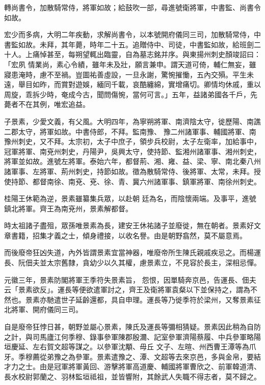\begin{pinyinscope}
 轉尚書令，加散騎常侍，將軍如故；給鼓吹一部，尋進號衛將軍，中書監、尚書令如故。



 宏少而多病，大明二年疾動，求解尚書令，以本號開府儀同三司，加散騎常侍，中書監如故。未拜，其年薨，時年二十五。追贈侍中、司徒，中書監如故，給班劍二十人。上痛悼甚至，每朔望輒出臨靈，自為墓志銘并序。與東揚州刺史顏竣詔曰：「宏夙
 情業尚，素心令績，雖年未及壯，願言兼申。謂天道可倚，輔仁無妄，雖寢患淹時，慮不至禍。豈圖祐善虛設，一旦永謝，驚惋摧慟，五內交殞。平生未遠，舉目如昨，而賞對遊娛，緬同千載，哀酷纏綿，實增痛切。卿情均休戚，重以周旋，乖拆少時，奄成今古，聞問傷惋，當何可言。」五年，益諸弟國各千戶，先薨者不在其例，唯宏追益。



 子景素，少愛文義，有父風。大明四年，為寧朔將軍、南濟陰太守，徙歷陽、南譙二郡太守，將軍如故。中書侍郎，不拜。監南豫、
 豫二州諸軍事、輔國將軍、南豫州刺史，又不拜。太宗初，太子中庶子，領步兵校尉，太子左衛率，加給事中，冠軍將軍、南兗州刺史，丹陽尹，吳興太守，使持節、監湘州諸軍事、湘州刺史，將軍並如故。進號左將軍。泰始六年，都督荊、湘、雍、益、梁、寧、南北秦八州諸軍事、左將軍、荊州刺史，持節如故。徵為散騎常侍、後將軍、太常，未拜。授使持節、都督南徐、南兗、兗、徐、青、冀六州諸軍事、鎮軍將軍、南徐州刺史。



 桂陽王休範為逆，景素雖纂集兵眾，以赴朝
 廷為名，而陰懷兩端。及事平，進號鎮北將軍。齊王為南兗州，景素解都督。



 時太祖諸子盡殂，眾孫唯景素為長，建安王休祐諸子並廢徙，無在朝者。景素好文章書籍，招集才義之士，傾身禮接，以收名譽。由是朝野翕然，莫不屬意焉。



 而後廢帝狂凶失道，內外皆謂景素宜當神器，唯廢帝所生陳氏親戚疾忌之。而楊運長、阮佃夫並太宗舊隸，貪幼少以久其權，慮景素立，不見容於長主，深相忌憚。



 元徽三年，景素防閣將軍王季符失景素旨，
 怨恨，因單騎奔京邑，告運長、佃夫云「景素欲反」。運長等便欲遣軍討之，齊王及衛將軍袁粲以下並保持之，謂為不然也。景素亦馳遣世子延齡還都，具自申理。運長等乃徙季符於梁州，又奪景素征北將軍、開府儀同三司。



 自是廢帝狂悖日甚，朝野並屬心景素，陳氏及運長等彌相猜疑。景素因此稍為自防之計，與司馬廬江何季穆、錄事參軍陳郡殷濔、記室參軍濟陽蔡履、中兵參軍略陽垣慶延、左右賀文超等謀之。以參軍沈顒、毋丘
 文子、左暄、州西曹王潭等為爪牙。季穆薦從弟豫之為參軍。景素遣豫之、潭、文超等去來京邑，多與金帛，要結才力之士。由是冠軍將軍黃回、游擊將軍高道慶、輔國將軍曹欣之、前軍韓道清、長水校尉郭蘭之、羽林監垣祗祖，並皆響附，其餘武人失職不得志者，莫不歸之。




\end{pinyinscope}
